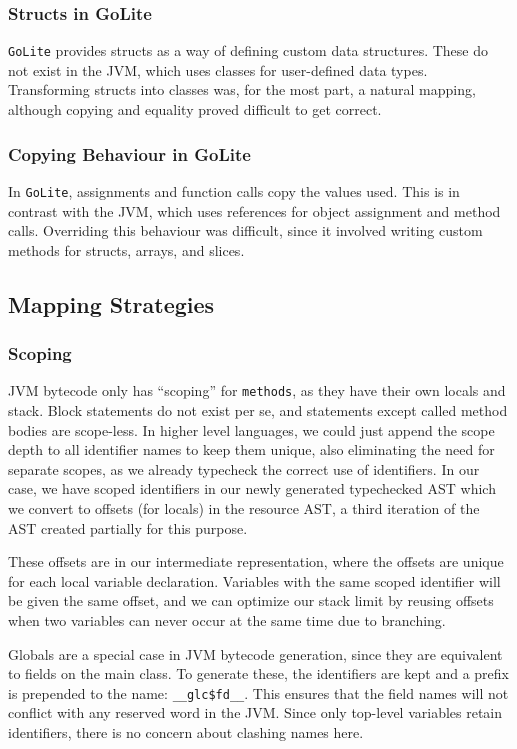 \documentclass[11pt]{article}
\begin{document}
\subsubsection{Structs in GoLite}
\texttt{GoLite} provides structs as a way of defining custom data structures.
These do not exist in the JVM, which uses classes for user-defined data types.
Transforming structs into classes was, for the most part, a natural mapping,
although copying and equality proved difficult to get correct.

\subsubsection{Copying Behaviour in GoLite}
In \texttt{GoLite}, assignments and function calls copy the values used.
This is in contrast with the JVM, which uses references for object assignment
and method calls. Overriding this behaviour was difficult, since it involved
writing custom methods for structs, arrays, and slices.

\subsection{Mapping Strategies}
\subsubsection{Scoping}
JVM bytecode only has ``scoping'' for \texttt{methods}, as they have
their own locals and stack. Block statements do not exist per se, and
statements except called method bodies are scope-less. In higher level
languages, we could just append the scope depth to all identifier
names to keep them unique, also eliminating the need for separate
scopes, as we already typecheck the correct use of identifiers. In our
case, we have scoped identifiers in our newly generated typechecked
AST which we convert to offsets (for locals) in the resource AST, a
third iteration of the AST created partially for this purpose.

These offsets are in our intermediate representation, where
the offsets are unique for each local variable declaration. Variables with
the same scoped identifier will be given the same offset, and we can
optimize our stack limit by reusing offsets when two variables can
never occur at the same time due to branching.

Globals are a special case in JVM bytecode generation, since they are
equivalent to fields on the main class. To generate these, the identifiers
are kept and a prefix is prepended to the name: \texttt{\_\_glc\$fd\_\_}. This
ensures that the field names will not conflict with any reserved word in
the JVM. Since only top-level variables retain identifiers, there is no
concern about clashing names here.
\end{document}
